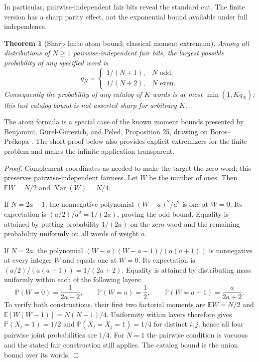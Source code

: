 \documentclass[11pt]{article}
\numberwithin{equation}{section}
\newtheorem{theorem}{Theorem}[section]
\theoremstyle{definition}
\theoremstyle{remark}
\newcommand{\Prob}{\mathbb P}
\begin{document}
In particular, pairwise-independent fair bits reveal the standard cut.
The finite version has a sharp parity effect, not the exponential bound
available under full independence.

\begin{theorem}[Sharp finite atom bound; classical moment extremum]
\label{rbc:thm:pairwise-atom}
Among all distributions of $N\ge1$ pairwise-independent fair bits, the
largest possible probability of any specified word is
\begin{equation}
 q_N=\begin{cases}
       1/(N+1),&N\text{ odd},\\
       1/(N+2),&N\text{ even}.
     \end{cases}
\label{rbc:eq:pairwise-parity}
\end{equation}
Consequently the probability of any catalog of $K$ words is at most
$\min(1,Kq_N)$; this last catalog bound is not asserted sharp for
arbitrary $K$.
\end{theorem}

The atom formula is a special case of the known moment bounds presented
by Benjamini, Gurel-Gurevich, and Peled, Proposition 25, drawing on
Boros--Pr\'ekopa \cite{benjamini-gurel-peled,boros-prekopa}.
The short proof below also provides explicit extremizers for the finite
problem and makes the infinite application transparent.

\begin{proof}
Complement coordinates as needed to make the target the zero word; this
preserves pairwise-independent fairness. Let $W$ be the number of ones.
Then $\mathbb EW=N/2$ and $\operatorname{Var}(W)=N/4$.

If $N=2a-1$, the nonnegative polynomial $(W-a)^2/a^2$ is one at $W=0$.
Its expectation is $(a/2)/a^2=1/(2a)$, proving the odd bound. Equality is
attained by putting probability $1/(2a)$ on the zero word and the remaining
probability uniformly on all words of weight $a$.

If $N=2a$, the polynomial
$(W-a)(W-a-1)/(a(a+1))$ is nonnegative at every integer $W$ and equals one
at $W=0$. Its expectation is $(a/2)/(a(a+1))=1/(2a+2)$. Equality is
attained by distributing mass uniformly within each of the following
layers:
\[
 \Prob(W=0)=\frac1{2a+2},\qquad
 \Prob(W=a)=\frac12,\qquad
 \Prob(W=a+1)=\frac{a}{2a+2}.
\]
To verify both constructions, their first two factorial moments are
$\mathbb EW=N/2$ and $\mathbb E[W(W-1)]=N(N-1)/4$. Uniformity within
layers therefore gives $\Prob(X_i=1)=1/2$ and
$\Prob(X_i=X_j=1)=1/4$ for distinct $i,j$, hence all four pairwise
joint probabilities are $1/4$. For $N=1$ the pairwise condition is
vacuous and the stated fair construction still applies. The catalog
bound is the union bound over its words.
\end{proof}
\end{document}
